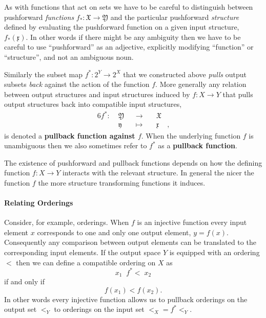 \documentclass[
  letterpaper,
  DIV=11,
  numbers=noendperiod]{scrartcl}
\let\oldparagraph\paragraph
\renewcommand{\paragraph}[1]{\oldparagraph{#1}\mbox{}}
\begin{document}
As with functions that act on sets we have to be careful to distinguish
between pushforward \emph{functions}
\(f_{*} : \mathfrak{X} \rightarrow \mathfrak{Y}\) and the particular
pushforward \emph{structure} defined by evaluating the pushforward
function on a given input structure, \(f_{*}(\mathfrak{x})\). In other
words if there might be any ambiguity then we have to be careful to use
``pushforward'' as an adjective, explicitly modifying ``function'' or
``structure'', and not an ambiguous noun.

Similarly the subset map \(f^{*} : 2^Y \rightarrow 2^X\) that we
constructed above \emph{pulls} output subsets \emph{back} against the
action of the function \(f\). More generally any relation between output
structures and input structures induced by \(f : X \rightarrow Y\) that
pulls output structures back into compatible input structures,
\begin{alignat*}{6}
f^{*} :\; & \mathfrak{Y} & &\rightarrow& \; & \mathfrak{X} &
\\
& \mathfrak{y} & &\mapsto& & \mathfrak{x} &,
\end{alignat*} is denoted a \textbf{pullback function against \(f\)}.
When the underlying function \(f\) is unambiguous then we also sometimes
refer to \(f^{*}\) as a \textbf{pullback function}.

The existence of pushforward and pullback functions depends on how the
defining function \(f : X \rightarrow Y\) interacts with the relevant
structure. In general the nicer the function \(f\) the more structure
transforming functions it induces.

\hypertarget{relating-orderings}{%
\paragraph{Relating Orderings}\label{relating-orderings}}

Consider, for example, orderings. When \(f\) is an injective function
every input element \(x\) corresponds to one and only one output
element, \(y = f(x)\). Consequently any comparison between output
elements can be translated to the corresponding input elements. If the
output space \(Y\) is equipped with an ordering \(<\) then we can define
a compatible ordering on \(X\) as \[
x_{1} \;\; f^{*}\!\!< \; x_{2}
\] if and only if \[
f(x_{1}) < f(x_{2}).
\] In other words every injective function allows us to pullback
orderings on the output set \(<_{Y}\) to orderings on the input set
\(<_{X} = f^{*}\!\!<_{Y}\).
\end{document}
